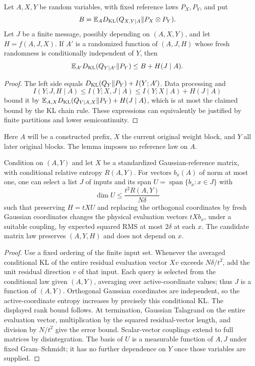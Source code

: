 \begin{lemma}
\label{lem:future-entropy}
Let $A,X,Y$ be random variables, with fixed reference laws $P_X,P_Y$, and put
\[
 B=\mathbb E_A D_{\rm KL}(Q_{X,Y\mid A}\Vert P_X\otimes P_Y).
\]
Let $J$ be a finite message, possibly depending on $(A,X,Y)$, and let
$H=f(A,J,X)$. If $A'$ is a randomized function of $(A,J,H)$ whose fresh
randomness is conditionally independent of $Y$, then
\[
 \mathbb E_{A'}D_{\rm KL}(Q_{Y\mid A'}\Vert P_Y)\le B+H(J\mid A).
\]
\end{lemma}
\begin{proof}
The left side equals $D_{\rm KL}(Q_Y\Vert P_Y)+I(Y;A')$.
Data processing and
\[
 I(Y;J,H\mid A)\le I(Y;X,J\mid A)
 \le I(Y;X\mid A)+H(J\mid A)
\]
bound it by $\mathbb E_{A,X}D_{\rm KL}(Q_{Y\mid A,X}\Vert P_Y)+H(J\mid A)$,
which is at most the claimed bound by the KL chain rule. These expressions
can equivalently be justified by finite partitions and lower semicontinuity.
\end{proof}

Here $A$ will be a constructed prefix, $X$ the current original weight block,
and $Y$ all later original blocks. The lemma imposes no reference law on $A$.

\begin{lemma}
\label{lem:block-entropy}
Condition on $(A,Y)$ and let $X$ be a standardized Gaussian-reference matrix,
with conditional relative entropy $R(A,Y)$. For vectors $b_x(A)$ of norm at
most one, one can select a list $J$ of inputs and its span
$U=\operatorname{span}\{b_x:x\in J\}$ with
\[
 \dim U\le\frac{t^2R(A,Y)}{N\delta}
\]
such that preserving $H=tXU$ and replacing the orthogonal coordinates by fresh
Gaussian coordinates changes the physical evaluation vectors $tXb_x$, under
a suitable coupling, by expected squared RMS at most $2\delta$ at each $x$.
The candidate matrix law preserves $(A,Y,H)$ and does not depend on $x$.
\end{lemma}
\begin{proof}
Use a fixed ordering of the finite input set. Whenever the averaged conditional
KL of the entire residual evaluation vector $Xv$ exceeds $N\delta/t^2$, add
the unit residual direction $v$ of that input. Each query is selected from
the conditional law given $(A,Y)$, averaging over active-coordinate values;
thus $J$ is a function of $(A,Y)$. Orthogonal Gaussian coordinates
are independent, so the active-coordinate entropy increases by precisely this
conditional KL. The displayed rank bound follows. At termination, Gaussian
Talagrand on the entire evaluation vector, multiplication by the squared
residual-vector length, and division by $N/t^2$ give the error bound.
Scalar-vector couplings extend to full matrices by disintegration.
The basis of $U$ is a measurable function of $A,J$ under fixed Gram--Schmidt;
it has no further dependence on $Y$ once those variables are supplied.
\end{proof}

